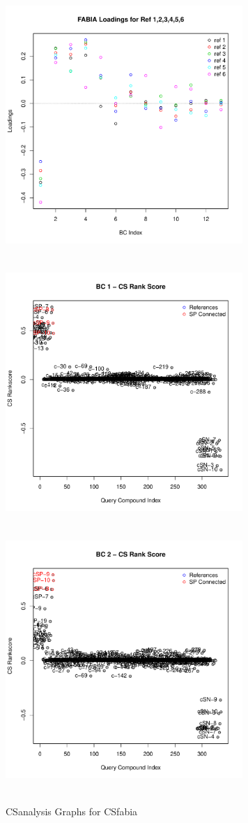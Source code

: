 \documentclass[a4paper]{article}\usepackage[]{graphicx}\usepackage[]{color}
\newenvironment{knitrout}{}{} %
\begin{document}
\begin{knitrout}
\begin{figure}[H]
\includegraphics[width=9cm,height=10cm]{figure/FABIA-1} 
\includegraphics[width=9cm,height=10cm]{figure/FABIA-2} 
\includegraphics[width=9cm,height=10cm]{figure/FABIA-3} \hfill{}

\caption[CSanalysis Graphs for CSfabia]{CSanalysis Graphs for CSfabia\label{fig:FABIA}}
\end{figure}


\end{knitrout}
\end{document}

